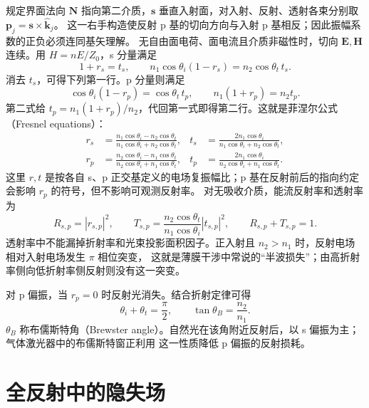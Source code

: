 规定界面法向 $\boldsymbol N$ 指向第二介质，$\boldsymbol s$ 垂直入射面，对入射、反射、透射各束分别取
$\boldsymbol p_j=\boldsymbol s\times\hat{\boldsymbol k}_j$。
这一右手构造使反射 p 基的切向方向与入射 p 基相反；因此振幅系数的正负必须连同基矢理解。
无自由面电荷、面电流且介质非磁性时，切向 $\boldsymbol E,\boldsymbol H$ 连续。用 $H=nE/Z_0$，s 分量满足
\[
 1+r_s=t_s,\qquad n_1\cos\theta_i(1-r_s)=n_2\cos\theta_t\,t_s.
\]
消去 $t_s$，可得下列第一行。p 分量则满足
\[
 \cos\theta_i(1-r_p)=\cos\theta_t\,t_p,\qquad
 n_1(1+r_p)=n_2t_p.
\]
第二式给 $t_p=n_1(1+r_p)/n_2$，代回第一式即得第二行。这就是菲涅尔公式（Fresnel equations）：
\begin{align}
 r_s&=\frac{n_1\cos\theta_i-n_2\cos\theta_t}
 {n_1\cos\theta_i+n_2\cos\theta_t},&
 t_s&=\frac{2n_1\cos\theta_i}
 {n_1\cos\theta_i+n_2\cos\theta_t},\\
 r_p&=\frac{n_2\cos\theta_i-n_1\cos\theta_t}
 {n_2\cos\theta_i+n_1\cos\theta_t},&
 t_p&=\frac{2n_1\cos\theta_i}
 {n_2\cos\theta_i+n_1\cos\theta_t}.
\end{align}
这里 $r,t$ 是按各自 s、p 正交基定义的电场复振幅比；p 基在反射前后的指向约定会影响 $r_p$ 的符号，但不影响可观测反射率。
对无吸收介质，能流反射率和透射率为
\begin{equation}
 R_{s,p}=|r_{s,p}|^2,
 \qquad
 T_{s,p}=\frac{n_2\cos\theta_t}{n_1\cos\theta_i}|t_{s,p}|^2,
 \qquad R_{s,p}+T_{s,p}=1.
\end{equation}
透射率中不能漏掉折射率和光束投影面积因子。正入射且 $n_2>n_1$ 时，反射电场相对入射电场发生 $\pi$ 相位突变，
这就是薄膜干涉中常说的“半波损失”；由高折射率侧向低折射率侧反射则没有这一突变。

对 p 偏振，当 $r_p=0$ 时反射光消失。结合折射定律可得
\begin{equation}
 \theta_i+\theta_t=\frac\pi2,
 \qquad
 \boxed{\tan\theta_B=\frac{n_2}{n_1}}.
\end{equation}
$\theta_B$ 称布儒斯特角（Brewster angle）。自然光在该角附近反射后，以 s 偏振为主；气体激光器中的布儒斯特窗正利用
这一性质降低 p 偏振的反射损耗。

\section{全反射中的隐失场}

